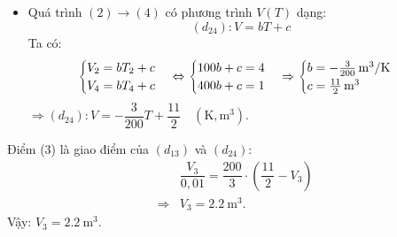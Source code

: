 \begin{vd}
{\begin{itemize}
				$$a=\dfrac{V_1}{T_1}=\SI{0.01}{\meter^3/\kelvin}\Rightarrow \left(d_{13}\right): V=0,01T\quad\left(\si{\kelvin}, \si{\meter^3}\right).$$
				\item Quá trình $(2)\rightarrow (4)$ có phương trình $V\left(T\right)$ dạng:
				$$\left(d_{24}\right): V=bT+c$$
				Ta có:
				\begin{equation*}
					\begin{cases}
						V_2=bT_2+c\\
						V_4=bT_4+c
					\end{cases}
					\Leftrightarrow
					\begin{cases}
						100b+c=4\\
						400b+c=1
					\end{cases}
					\Rightarrow 
					\begin{cases}
						b=\xsi{-\frac{3}{200}}{\meter^3/\kelvin}\\
						c=\xsi{\frac{11}{2}}{\meter^3}
					\end{cases}
				\end{equation*}
				$\Rightarrow \left(d_{24}\right): V=-\dfrac{3}{200}T+\dfrac{11}{2}\quad \left(\si{\kelvin}, \si{\meter^3}\right).$
				
			\end{itemize}
			Điểm (3) là giao điểm của $\left(d_{13}\right)$ và $\left(d_{24}\right)$:
			\begin{eqnarray*}
				&& \dfrac{V_3}{0,01}=\dfrac{200}{3}\cdot\left(\dfrac{11}{2}-V_3\right)\\
				&\Rightarrow& V_3=\SI{2.2}{\meter^3}.
			\end{eqnarray*}
			Vậy: $V_3=\SI{2.2}{\meter^3}$.
			
	}
\end{vd}

